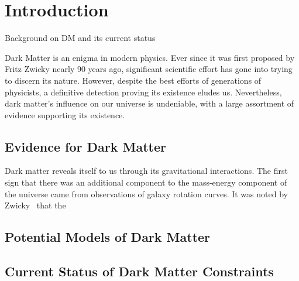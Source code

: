 \graphicspath{{img/chapter_1/}}

\chapter{Introduction}
\label{chapter:introduction}

\begin{synopsis}
Background on DM and its current status
\end{synopsis}

Dark Matter is an enigma in modern physics. Ever since it was first 
proposed by Fritz Zwicky nearly 90 years ago, significant scientific
effort has gone into trying to discern its nature. However, despite the
best efforts of generations of physicists, a definitive detection
proving its existence eludes us. Nevertheless, dark matter's influence 
on our universe is undeniable, with a large assortment of evidence 
supporting its existence. 


\section{Evidence for Dark Matter}

Dark matter reveals itself to us through its gravitational interactions. The first sign that there was an additional component to the mass-energy component of the universe came from observations of galaxy rotation curves. It was noted by Zwicky~ that the 
\section{Potential Models of Dark Matter}


\section{Current Status of Dark Matter Constraints}

